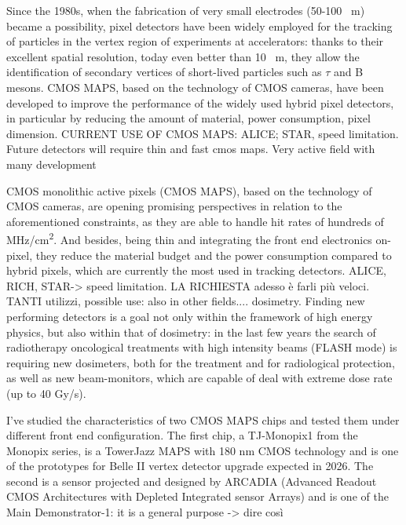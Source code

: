 \documentclass[a4paper]{report}
\begin{document}
\linenumbers

Since the 1980s, when the fabrication of very small electrodes (50-100 \unit{\mu m}) became a possibility, pixel detectors have been widely employed for the tracking of particles in the vertex region of experiments at accelerators: thanks to their excellent spatial resolution, today even better than 10 \unit{\mu m}, they allow the identification of secondary vertices of short-lived particles such as $\tau$ and B mesons. 
CMOS MAPS, based on the technology of CMOS cameras, have been developed to improve the performance of the widely used hybrid pixel detectors, in particular by reducing the amount of material, power consumption, pixel dimension.  CURRENT USE OF CMOS MAPS: ALICE; STAR, speed limitation.\\

Future detectors will require thin and fast cmos maps. 
Very active field with many development

CMOS monolithic active pixels (CMOS MAPS), based on the technology of CMOS cameras, are opening promising perspectives in relation to the aforementioned constraints, as they are able to handle hit rates of hundreds of \unit{MHz/cm^2}. And besides, being thin and integrating the front end electronics on-pixel, they reduce the material budget and the power consumption compared to hybrid pixels, which are currently the most used in tracking detectors.
ALICE, RICH, STAR-> speed limitation. LA RICHIESTA adesso è farli più veloci. 
TANTI utilizzi, possible use: also in other fields.... dosimetry. 
Finding new performing detectors is a goal not only within the framework of high energy physics, but also within that of dosimetry: in the last few years the search of radiotherapy oncological treatments with high intensity beams (FLASH mode) is requiring new dosimeters, both for the treatment and for radiological protection, as well as new beam-monitors, which are capable of deal with extreme dose rate (up to 40 \unit{Gy/s}).

I've studied the characteristics of two CMOS MAPS chips and tested them under different front end configuration. The first chip, a TJ-Monopix1 from the Monopix series, is a TowerJazz MAPS with 180 nm CMOS technology and is one of the prototypes for Belle II vertex detector upgrade expected in 2026. The second is a sensor projected and designed by ARCADIA (Advanced Readout CMOS Architectures with Depleted Integrated sensor Arrays) and is one of the Main Demonstrator-1: it is a general purpose -> dire così
 
\end{document}
